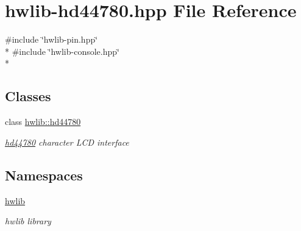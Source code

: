 \hypertarget{hwlib-hd44780_8hpp}{}\section{hwlib-\/hd44780.hpp File Reference}
\label{hwlib-hd44780_8hpp}
{\ttfamily \#include \char`\"{}hwlib-\/pin.\+hpp\char`\"{}}\\*
{\ttfamily \#include \char`\"{}hwlib-\/console.\+hpp\char`\"{}}\\*
\subsection*{Classes}
\begin{DoxyCompactItemize}
\item 
class \hyperlink{classhwlib_1_1hd44780}{hwlib\+::hd44780}
\begin{DoxyCompactList}\small\item\em \hyperlink{classhwlib_1_1hd44780}{hd44780} character L\+CD interface \end{DoxyCompactList}\end{DoxyCompactItemize}
\subsection*{Namespaces}
\begin{DoxyCompactItemize}
\item 
 \hyperlink{namespacehwlib}{hwlib}
\begin{DoxyCompactList}\small\item\em hwlib library \end{DoxyCompactList}\end{DoxyCompactItemize}
